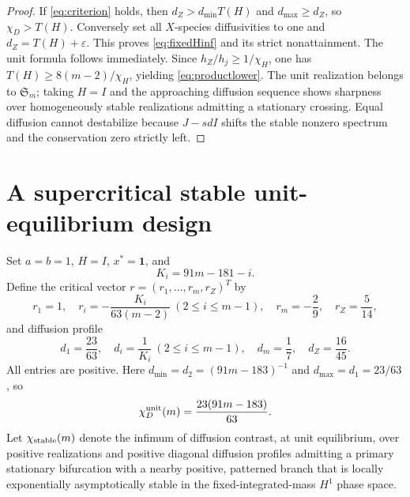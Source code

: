 \documentclass[11pt]{article}
\theoremstyle{definition}
\newcommand{\1}{\mathbf 1}
\begin{document}
\begin{proof}
If \eqref{eq:criterion} holds, then
$d_Z>d_{\min}T(H)$ and $d_{\max}\ge d_Z$, so $\chi_D>T(H)$.
Conversely set all $X$-species diffusivities to one and
$d_Z=T(H)+\varepsilon$.  This proves \eqref{eq:fixedHinf} and its strict
nonattainment.  The unit formula follows immediately.  Since
$h_Z/h_j\ge1/\chi_H$, one has
$T(H)\ge8(m-2)/\chi_H$, yielding \eqref{eq:productlower}.  The unit realization belongs to $\mathfrak S_m$; taking $H=I$ and the approaching diffusion sequence shows sharpness over homogeneously stable realizations admitting a stationary crossing.
Equal diffusion cannot destabilize because $J-sdI$ shifts the stable nonzero
spectrum and the conservation zero strictly left.
\end{proof}

\section{A supercritical stable unit-equilibrium design}

Set $a=b=1$, $H=I$, $x^*=\1$, and
\begin{equation}\label{eq:Ki}
 K_i=91m-181-i.
\end{equation}
Define the critical vector $r=(r_1,\ldots,r_m,r_Z)^T$ by
\begin{equation}\label{eq:rimp}
 r_1=1,\quad
 r_i=-\frac{K_i}{63(m-2)}\ (2\le i\le m-1),\quad
 r_m=-\frac29,\quad r_Z=\frac5{14},
\end{equation}
and diffusion profile
\begin{equation}\label{eq:Dimp}
 d_1=\frac{23}{63},\quad
 d_i=\frac1{K_i}\ (2\le i\le m-1),\quad
 d_m=\frac17,\quad d_Z=\frac{16}{45}.
\end{equation}
All entries are positive.  Here
$d_{\min}=d_2=(91m-183)^{-1}$ and $d_{\max}=d_1=23/63$, so
\begin{equation}\label{eq:improvedcontrast}
 \chi_D^{\rm unit}(m)=\frac{23(91m-183)}{63}.
\end{equation}
Let $\chi_{\rm stable}(m)$ denote the infimum of diffusion contrast, at unit
equilibrium, over positive realizations and positive diagonal diffusion
profiles admitting a primary stationary bifurcation with a nearby positive,
patterned branch that is locally exponentially asymptotically stable in the
fixed-integrated-mass $H^1$ phase space.
\end{document}
